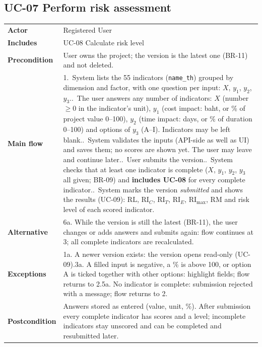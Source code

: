 \documentclass[11pt,a4paper]{article}
\newcommand{\RL}{\mathrm{RL}}
\newcommand{\RIC}{\mathrm{RI}_{C}}
\newcommand{\RIT}{\mathrm{RI}_{T}}
\newcommand{\RIE}{\mathrm{RI}_{E}}
\newcommand{\RImax}{\mathrm{RI}_{\max}}
\newcommand{\RM}{\mathrm{RM}}
\begin{document}
\noindent\begin{minipage}{\linewidth}
\subsection*{UC-07 Perform risk assessment}
\begin{tabularx}{\linewidth}{@{}>{\raggedright\leavevmode\bfseries\color{creBlue}}p{2.6cm} Y@{}}
\toprule
Actor & Registered User \\
Includes & UC-08 Calculate risk level \\
Precondition & User owns the project; the version is the latest one (BR-11) and not deleted. \\
Main flow & 1.~System lists the 55 indicators (\texttt{name\_th}) grouped by dimension and factor, with one question per input: $X$, $y_1$, $y_2$, $y_3$..~The user answers any number of indicators: $X$ (number $\ge 0$ in the indicator's unit), $y_1$ (cost impact: baht, or \% of project value 0--100), $y_2$ (time impact: days, or \% of duration 0--100) and options of $y_3$ (A--I). Indicators may be left blank..~System validates the inputs (API-side as well as UI) and saves them; no scores are shown yet. The user may leave and continue later..~User submits the version..~System checks that at least one indicator is complete ($X$, $y_1$, $y_2$, $y_3$ all given; BR-09) and \textbf{includes UC-08} for every complete indicator..~System marks the version \emph{submitted} and shows the results (UC-09): $\RL$, $\RIC$, $\RIT$, $\RIE$, $\RImax$, $\RM$ and risk level of each scored indicator. \\
Alternative & 6a. While the version is still the latest (BR-11), the user changes or adds answers and submits again: flow continues at 3; all complete indicators are recalculated. \\
Exceptions & 1a. A newer version exists: the version opens read-only (UC-09).\newline 3a. A filled input is negative, a \% is above 100, or option A is ticked together with other options: highlight fields; flow returns to 2.\newline 5a. No indicator is complete: submission rejected with a message; flow returns to 2. \\
Postcondition & Answers stored as entered (value, unit, \%). After submission every complete indicator has scores and a level; incomplete indicators stay unscored and can be completed and resubmitted later. \\
\bottomrule
\end{tabularx}
\end{minipage}
\par\medskip
\end{document}
